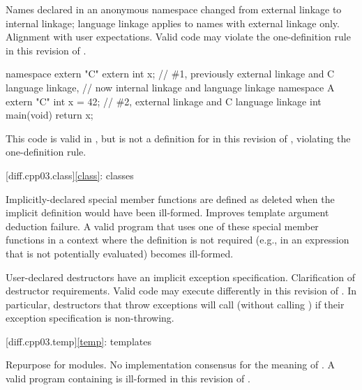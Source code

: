 \change
Names declared in an anonymous namespace
changed from external linkage to internal linkage;
language linkage applies to names with external linkage only.
\rationale
Alignment with user expectations.
\effect
Valid \CppIII{} code may violate the one-definition rule
in this revision of \Cpp{}.
\begin{example}
\begin{codeblock}
namespace { extern "C" { extern int x; } }  // \#1, previously external linkage and C language linkage,
                                            // now internal linkage and \Cpp{} language linkage
namespace A { extern "C" int x = 42; }      // \#2, external linkage and C language linkage
int main(void) { return x; }
\end{codeblock}
This code is valid in \CppIII{},
but  is not a definition for 
in this revision of \Cpp{}, violating the one-definition rule.
\end{example}

[diff.cpp03.class]{\ref{class}: classes}

\change
Implicitly-declared special member functions are defined as deleted
when the implicit definition would have been ill-formed.
\rationale
Improves template argument deduction failure.
\effect
A valid \CppIII{} program that uses one of these special member functions in a
context where the definition is not required (e.g., in an expression that is
not potentially evaluated) becomes ill-formed.

\change
User-declared destructors have an implicit exception specification.
\rationale
Clarification of destructor requirements.
\effect
Valid \CppIII{} code may execute differently in this revision of \Cpp{}. In
particular, destructors that throw exceptions will call 
(without calling ) if their exception specification is
non-throwing.

[diff.cpp03.temp]{\ref{temp}: templates}

\change
Repurpose  for modules.
\rationale
No implementation consensus for the \CppIII{} meaning of .
\effect
A valid \CppIII{} program containing  is ill-formed in this
revision of \Cpp{}.


